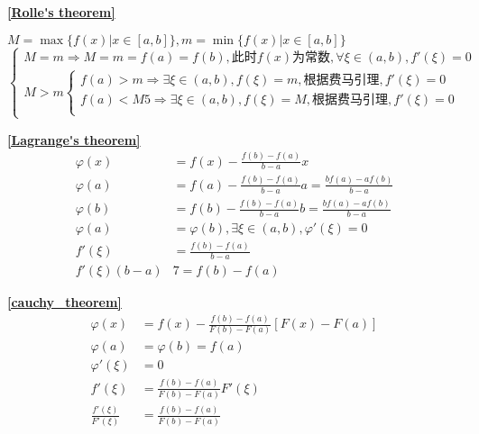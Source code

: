 \textbf{\large \ref{Rolle's theorem}}
\begin{center}
    $M=\max\{f(x)|x\in[a,b]\},m=\min\{f(x)|x\in[a,b]\}$
    $\begin{cases}
        M=m\Rightarrow M=m=f(a)=f(b),\mbox{此时}f(x)\mbox{为常数},\forall \xi \in(a,b),f'(\xi)=0\\
        M>m \begin{cases}
            f(a)>m \Rightarrow \exists \xi \in(a,b),f(\xi)=m,\mbox{根据费马引理},f'(\xi)=0\\
            f(a)<M5 \Rightarrow \exists \xi \in(a,b),f(\xi)=M,\mbox{根据费马引理},f'(\xi)=0\\
        \end{cases}
    \end{cases}$
\end{center}
\textbf{\large \ref{Lagrange's theorem}}
\begin{displaymath}
    \begin{split}
        \varphi(x)&=f(x)-\frac{f(b)-f(a)}{b-a}x\\
        \varphi(a)&=f(a)-\frac{f(b)-f(a)}{b-a}a=\frac{bf(a)-af(b)}{b-a}\\
        \varphi(b)&=f(b)-\frac{f(b)-f(a)}{b-a}b=\frac{bf(a)-af(b)}{b-a}\\
        \varphi(a)&=\varphi(b),\exists \xi\in(a,b),\varphi'(\xi)=0\\
        f'(\xi)&=\frac{f(b)-f(a)}{b-a}\\
        f'(\xi)(b-a)&7=f(b)-f(a)
    \end{split}
\end{displaymath}

\textbf{\large \ref{cauchy_theorem}}
\begin{displaymath}
    \begin{split}
        \varphi(x)&=f(x)-\frac{f(b)-f(a)}{F(b)-F(a)}\left[F(x)-F(a)\right] \\
        \varphi(a)&=\varphi(b)=f(a)\\
        \varphi'(\xi)&=0\\
        f'(\xi)&=\frac{f(b)-f(a)}{F(b)-F(a)}F'(\xi)\\
        \frac{f'(\xi)}{F'(\xi)}&=\frac{f(b)-f(a)}{F(b)-F(a)}
    \end{split}
\end{displaymath}

